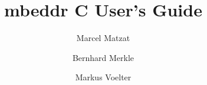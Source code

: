 \documentclass{llncs}
\title{mbeddr C User's Guide}
\author{Marcel Matzat\inst{1} \and Bernhard Merkle\inst{2} \and Markus
Voelter\inst{3}}
\institute{itemis AG \and Sick AG \and independent/itemis}
\begin{document}
\maketitle

\begin{abstract}
 
\end{abstract} 



 
%
\end{document}
